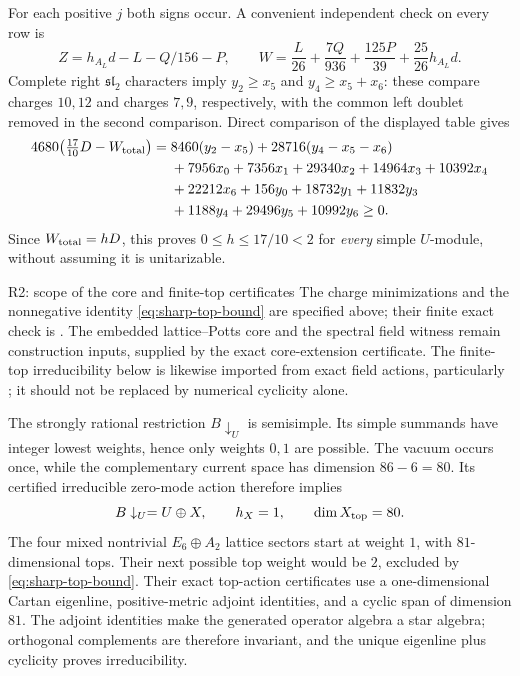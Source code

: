 For each positive $j$ both signs occur. A convenient independent
check on every row is
\[
 Z=h_{A_L}d-L-Q/156-P,\qquad
 W=\frac L{26}+\frac{7Q}{936}+\frac{125P}{39}
                              +\frac{25}{26}h_{A_L}d.
\]
Complete right $\mathfrak{sl}_2$ characters imply
$y_2\ge x_5$ and $y_4\ge x_5+x_6$: these compare charges $10,12$
and charges $7,9$, respectively, with the common left doublet removed
in the second comparison. Direct comparison of the displayed table gives
\begin{align}
 4680\bigl(\tfrac{17}{10}D-W_{\rm total}\bigr)
 ={}&8460(y_2-x_5)+28716(y_4-x_5-x_6)\notag\\
 &+7956x_0+7356x_1+29340x_2+14964x_3+10392x_4\notag\\
 &+22212x_6+156y_0+18732y_1+11832y_3\notag\\
 &+1188y_4+29496y_5+10992y_6\ge0.
 \label{eq:sharp-top-bound}
\end{align}
Since $W_{\rm total}=hD$, this proves $0\le h\le17/10<2$ for
\emph{every} simple $U$-module, without assuming it is unitarizable.

\begin{reviewnote}{R2: scope of the core and finite-top certificates}
The charge minimizations and the nonnegative identity
\eqref{eq:sharp-top-bound} are specified above; their finite exact
check is
.
The embedded lattice--Potts core and the spectral field witness remain
construction inputs, supplied by the exact core-extension certificate.
The finite-top irreducibility below is likewise imported from exact
field actions, particularly
; it should not be replaced
by numerical cyclicity alone.
\end{reviewnote}

The strongly rational restriction $B\downarrow_U$ is semisimple. Its
simple summands have integer lowest weights, hence only weights $0,1$
are possible. The vacuum occurs once, while the complementary current
space has dimension $86-6=80$. Its certified irreducible zero-mode
action therefore implies
\begin{equation}
 B\downarrow_U=U\oplus X,\qquad h_X=1,\qquad\dim X_{\rm top}=80.
 \label{eq:B-branching}
\end{equation}
The four mixed nontrivial $E_6\oplus A_2$ lattice sectors start at
weight $1$, with $81$-dimensional tops. Their next possible top weight
would be $2$, excluded by \eqref{eq:sharp-top-bound}. Their exact
top-action certificates use a one-dimensional Cartan eigenline,
positive-metric adjoint identities, and a cyclic span of dimension
$81$. The adjoint identities make the generated operator algebra a
star algebra; orthogonal complements are therefore invariant, and
the unique eigenline plus cyclicity proves irreducibility.

